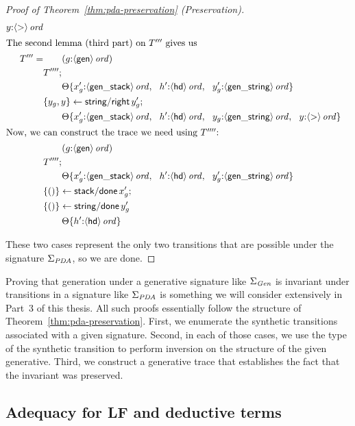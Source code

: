 \begin{proof}[Proof of Theorem~\ref{thm:pda-preservation} (Preservation)]
\begin{align*}
{                   y{:}{\langle {\sf >} \rangle}\,{{\it ord}}}\\
\intertext{The second lemma (third part) on $T'''$ gives us}
T''' = & \qquad ({g{:}{\langle {\sf gen} \rangle}\,{{\it ord}}})\\
& T'''';\\
& \qquad {\Theta}\{{x_g'{:}{\langle {\sf gen\_stack} \rangle}\,{{\it ord}}, ~~
                   h'{:}{\langle {\sf hd} \rangle}\,{{\it ord}}, ~~
                   y_g'{:}{\langle {\sf gen\_string} \rangle}\,{{\it ord}}}\}\\
& \{{y_g, y}\} \leftarrow {{\sf string/right}\,y_g'};\\
& \qquad {\Theta}\{{x_g'{:}{\langle {\sf gen\_stack} \rangle}\,{{\it ord}}, ~~
                   h'{:}{\langle {\sf hd} \rangle}\,{{\it ord}}, ~~
                   y_g{:}{\langle {\sf gen\_string} \rangle}\,{{\it ord}}, ~~
                   y{:}{\langle {\sf >} \rangle}\,{{\it ord}}}\}\\
\intertext{Now, we can construct the trace we need using $T''''$:}
& \qquad ({g{:}{\langle {\sf gen} \rangle}\,{{\it ord}}})\\
& T'''';\\
& \qquad {\Theta}\{{x_g'{:}{\langle {\sf gen\_stack} \rangle}\,{{\it ord}}, ~~
                   h'{:}{\langle {\sf hd} \rangle}\,{{\it ord}}, ~~
                   y_g'{:}{\langle {\sf gen\_string} \rangle}\,{{\it ord}}}\}\\
& \{{()}\} \leftarrow {{\sf stack/done}\,x_g'};\\
& \{{()}\} \leftarrow {{\sf string/done}\,y_g'}\\
& \qquad {\Theta}\{{h'{:}{\langle {\sf hd} \rangle}\,{{\it ord}}}\}
\end{align*}

\noindent
These two cases represent the only two transitions that are possible
under the signature $\Sigma_{\it PDA}$, so we are done.
\end{proof}

Proving that generation under a generative signature like $\Sigma_{\it
  Gen}$ is invariant under transitions in a signature like
$\Sigma_{\it PDA}$ is something we will consider extensively in Part~3
of this thesis. All such proofs essentially follow the structure of
Theorem~\ref{thm:pda-preservation}. First, we enumerate the synthetic
transitions associated with a given signature. Second, in each of those
cases, we use the type of the synthetic transition to perform
inversion on the structure of the given generative.
Third, we construct a generative
trace that establishes the fact that the invariant was preserved.

\subsection{Adequacy for LF and deductive terms}

